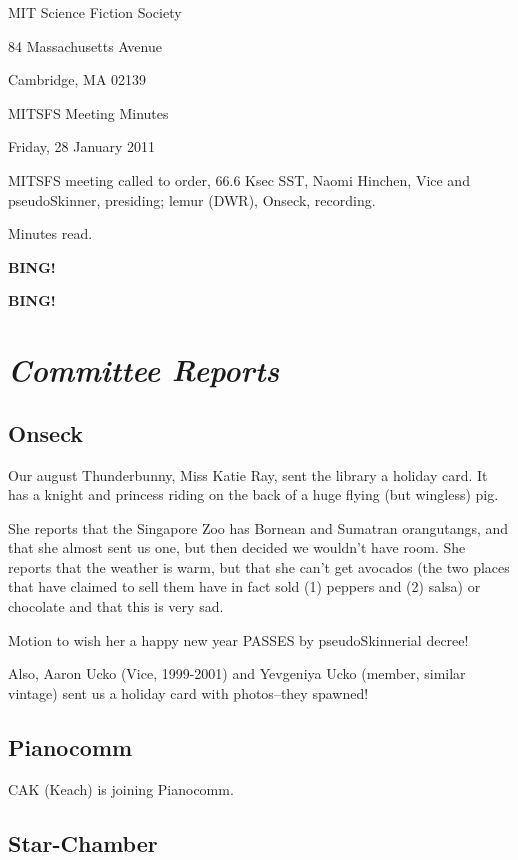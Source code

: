 \documentclass[10pt]{article}
\newcommand{\bing}{{\bf BING!} }
\newcommand{\goto}[1]{\bing \vskip 12pt \section*{{\em{#1}}}}
\newcommand{\skinner}{Naomi Hinchen, Vice and pseudoSkinner}
\newcommand{\onseck}{lemur (DWR), Onseck}
\newcommand{\meetingdate}{Friday, 28 January 2011}
\begin{document}
\begin{center}

MIT Science Fiction Society

84 Massachusetts Avenue

Cambridge, MA 02139

\vspace{12pt}

MITSFS Meeting Minutes

\meetingdate

\end{center}

\vspace{18pt}

\setlength{\parskip}{6pt}

\noindent
MITSFS meeting called to order, 66.6 Ksec SST,
\skinner, presiding; \onseck, recording.

Minutes read.

\bing

\goto{Committee Reports}

\subsection*{Onseck}

Our august Thunderbunny, Miss Katie Ray, sent the library a holiday card.
It has a knight and princess riding on the back of a huge flying (but wingless)
pig.

She reports that the Singapore Zoo has Bornean and Sumatran orangutangs, and
that she almost sent us one, but then decided we wouldn't have room.  She
reports that the weather is warm, but that she can't get avocados (the two
places that have claimed to sell them have in fact sold (1) peppers and (2)
salsa) or chocolate and that this is very sad.

Motion to wish her a happy new year PASSES by pseudoSkinnerial decree!

Also, Aaron Ucko (Vice, 1999-2001) and Yevgeniya Ucko (member, similar
vintage) sent us a holiday card with photos--they spawned!

\subsection*{Pianocomm}

CAK (Keach) is joining Pianocomm.

\subsection*{Star-Chamber}
\end{document}
